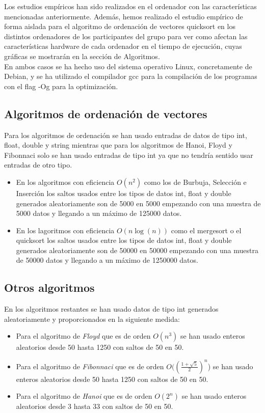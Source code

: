 \documentclass[11pt]{article}
\begin{document}
    Los estudios empíricos han sido realizados en el ordenador con las características mencionadas anteriormente.
    Además, hemos realizado el estudio empírico de forma aislada para el algoritmo de ordenación de vectores
    quicksort en los distintos ordenadores de los participantes del grupo para ver como afectan las características
    hardware de cada ordenador en el tiempo de ejecución, cuyas gráficas se mostrarán en la sección de Algoritmos. \\
    En ambos casos se ha hecho uso del sistema operativo Linux, concretamente de Debian, y se ha utilizado el
    compilador gcc para la compilación de los programas  con el flag -Og para la optimización.
    \subsection{Algoritmos de ordenación de vectores}
    Para los algoritmos de ordenación se han usado entradas de datos de tipo int, float, double y string mientras que para los algoritmos de Hanoi, Floyd  y Fibonnaci solo se han usado entradas de tipo int 
    ya que no tendría sentido usar entradas de otro tipo. 
    \begin{itemize}
        \item En los algoritmos con eficiencia  \(O(n^2)\) como los de Burbuja, Selección e Inserción los saltos usados entre los tipos de datos int, float y double generados aleatoriamente son de 5000 en 5000 empezando con una muestra de 5000 datos y llegando a
        un máximo de 125000 datos.
        \item En los lagoritmos con eficiencia \(O (n\log(n))\) como el mergesort o el quicksort los saltos usados entre los tipos de datos int, float y double generados aleatoriamente son de 50000 en 50000 empezando con una muestra de 50000 datos y llegando a
        un máximo de 1250000 datos.
    \end{itemize}

    \subsection{Otros algoritmos}
    En los algoritmos restantes se han usado datos de tipo int generados aleatoriamente y proporcionados en la siguiente medida:
    \begin{itemize}
        \item Para el algoritmo de \textit{Floyd}  que es de orden \(O(n^3)\) se han usado enteros aleatorios desde 50 hasta 1250 con saltos de 50 en 50.
        \item Para el algoritmo de \textit{Fibonnaci}  que es de orden \(O((\frac{1+\sqrt{5}}{2})^n\)) se han usado enteros aleatorios desde 50 hasta 1250 con saltos de 50 en 50.
        \item Para el algoritmo de \textit{Hanoi} que es de orden \(O(2^n)\) se han usado enteros aleatorios desde 3 hasta 33 con saltos de 50 en 50. 
    \end{itemize}
\end{document}
